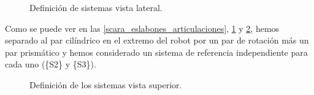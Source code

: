 \documentclass[a4paper,12pt]{article}
\begin{document}
\begin{figure}[H]
    \centering
    \begin{adjustbox}{scale = 0.662, max width=\columnwidth}
    \end{adjustbox}
    \caption{Definición de sistemas vista lateral.}
    \label{scara_sistemas_lateral}
\end{figure}

Como se puede ver en las \cref{scara_eslabones_articulaciones}, \cref{scara_sistemas_lateral} y \cref{scara_sistemas_superior},
hemos separado al par cilíndrico en el extremo del robot por un par de rotación más un par prismático
y hemos considerado un sistema de referencia independiente para cada uno (\{S2\} y \{S3\}).

\begin{figure}[H]
    \centering
    \begin{adjustbox}{scale = 0.7, max width=\columnwidth}
    \end{adjustbox}
    \caption{Definición de los sistemas vista superior.}
    \label{scara_sistemas_superior}
\end{figure}
\end{document}
